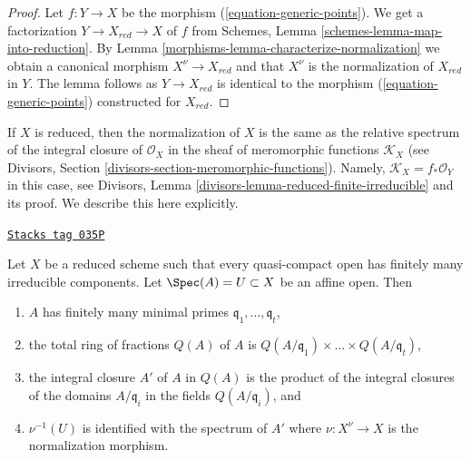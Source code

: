 \begin{proof}

Let $f : Y \to X$ be the morphism (\ref{equation-generic-points}).
We get a factorization $Y \to X_{red} \to X$ of $f$ from
Schemes, Lemma \ref{schemes-lemma-map-into-reduction}.
By Lemma \ref{morphisms-lemma-characterize-normalization} we obtain a canonical
morphism $X^\nu \to X_{red}$
and that $X^\nu$ is the normalization of $X_{red}$ in $Y$.
The lemma follows as $Y \to X_{red}$ is identical to the morphism
(\ref{equation-generic-points}) constructed for $X_{red}$.
\end{proof}

If $X$ is reduced, then the normalization of $X$ is the same
as the relative spectrum of the integral closure of $\mathcal{O}_X$
in the sheaf of meromorphic functions $\mathcal{K}_X$
(see Divisors, Section \ref{divisors-section-meromorphic-functions}).
Namely, $\mathcal{K}_X = f_*\mathcal{O}_Y$ in this case, see
Divisors, Lemma \ref{divisors-lemma-reduced-finite-irreducible}
and its proof. We describe this here explicitly.

\begin{lemma}
\label{morphisms-lemma-description-normalization}
\href{https://stacks.math.columbia.edu/tag/035P}{\texttt{Stacks tag 035P}}

Let $X$ be a reduced scheme such that every quasi-compact open has
finitely many irreducible components. Let $\Spec(A) = U \subset X$
be an affine open. Then
\begin{enumerate}
\item $A$ has finitely many minimal primes
$\mathfrak q_1, \ldots, \mathfrak q_t$,
\item the total ring of fractions $Q(A)$ of $A$ is
$Q(A/\mathfrak q_1) \times \ldots \times Q(A/\mathfrak q_t)$,
\item the integral closure $A'$ of $A$ in $Q(A)$ is the product of
the integral closures of the domains $A/\mathfrak q_i$
in the fields $Q(A/\mathfrak q_i)$, and
\item $\nu^{-1}(U)$ is identified with the spectrum of $A'$ where
$\nu : X^\nu \to X$ is the normalization morphism.
\end{enumerate}
\end{lemma}

